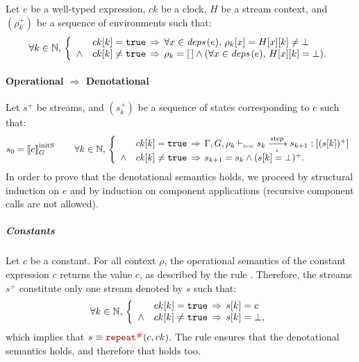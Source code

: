 \begin{skippableproof}
    Let $e$ be a well-typed \GRSync expression, $ck$ be a clock, $H$ be a stream context, and
    $(\rho_k^+)$ be a sequence of environments such that:
    \begin{equation*}
        \forall k \in \mathbb{N}, \,
        \left\{
        \begin{array}{ll}
                   & ck[k] = \mathtt{{true}} \, \Rightarrow \,
            \forall x \in {\ensuremath{\textit{deps}\left(e\right)}}, \, \rho_k[x] = H[x][k] \neq \bot                \\
            \wedge & ck[k] \neq \mathtt{{true}} \, \Rightarrow \,
            \rho_k = [\,] \wedge (\forall x \in {\ensuremath{\textit{deps}\left(e\right)}}, \,  H[x][k] = \bot). \\
        \end{array}
        \right.
    \end{equation*}

    \paragraph{Operational $\Rightarrow$ Denotational}
    \label{sec:semantics:grsync:theorems:equivalence:e:proof:op_to_den}
    Let $s^+$ be streams, and $(s_k^+)$ be a sequence of states corresponding to $e$ such that:
    \begin{equation*}
        s_0 = \initstate{e} \qquad
        \forall k \in \N, \,
        \left\{
        \begin{array}{ll}
                   & ck[k] = \true \, \Rightarrow \, \exprOpsem{\rho_k}{s_k}{e}{s_{k+1}}{(s[k])^+} \\
            \wedge & ck[k] \neq \true \, \Rightarrow \, s_{k+1} = s_k \wedge (s[k] = \bot)^+.      \\
        \end{array}
        \right.
    \end{equation*}
    In order to prove that the denotational semantics 
    holds, we proceed by structural induction on $e$ and by induction on component applications
    (recursive component calls are not allowed).

    \subparagraph{Constants}
    Let $c$ be a constant. For all context $\rho$, the operational semantics of the constant
    expression $c$ returns the value $c$, as described by the rule
    . Therefore, the streams $s^+$
    constitute only one stream denoted by $s$ such that:
    \begin{equation*}
        \forall k \in \mathbb{N}, \,
        \left\{
        \begin{array}{ll}
                   & ck[k] = \mathtt{{true}} \, \Rightarrow \, s[k] = c         \\
            \wedge & ck[k] \neq \mathtt{{true}} \, \Rightarrow \,  s[k] = \bot, \\
        \end{array}
        \right.
    \end{equation*}
    which implies that $s \equiv \const{c}{ck}$. The rule
     ensures that the denotational semantics
     holds, and therefore that
     holds too.


\end{skippableproof}
